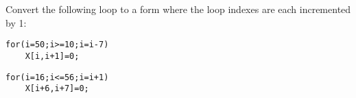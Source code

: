 \documentclass[11pt]{article}
\begin{document}
\section{}

Convert the following loop to a form where the loop indexes are each incremented by 1:
\begin{verbatim}
for(i=50;i>=10;i=i-7) 
    X[i,i+1]=0;
\end{verbatim}

\begin{Answer}
\begin{verbatim}
for(i=16;i<=56;i=i+1) 
    X[i+6,i+7]=0;
\end{verbatim}
\end{Answer}
\end{document}
